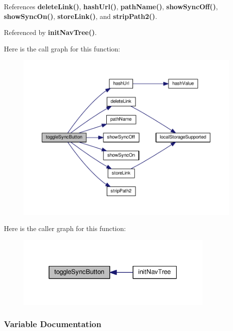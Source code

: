 References {\bf delete\+Link()}, {\bf hash\+Url()}, {\bf path\+Name()}, {\bf show\+Sync\+Off()}, {\bf show\+Sync\+On()}, {\bf store\+Link()}, and {\bf strip\+Path2()}.



Referenced by {\bf init\+Nav\+Tree()}.



Here is the call graph for this function\+:
\nopagebreak
\begin{figure}[H]
\begin{center}
\leavevmode
\includegraphics[width=350pt]{d6/d95/navtree_8js_a646cb31d83b39aafec92e0e1d123563a_cgraph}
\end{center}
\end{figure}




Here is the caller graph for this function\+:
\nopagebreak
\begin{figure}[H]
\begin{center}
\leavevmode
\includegraphics[width=277pt]{d6/d95/navtree_8js_a646cb31d83b39aafec92e0e1d123563a_icgraph}
\end{center}
\end{figure}




\subsubsection{Variable Documentation}
